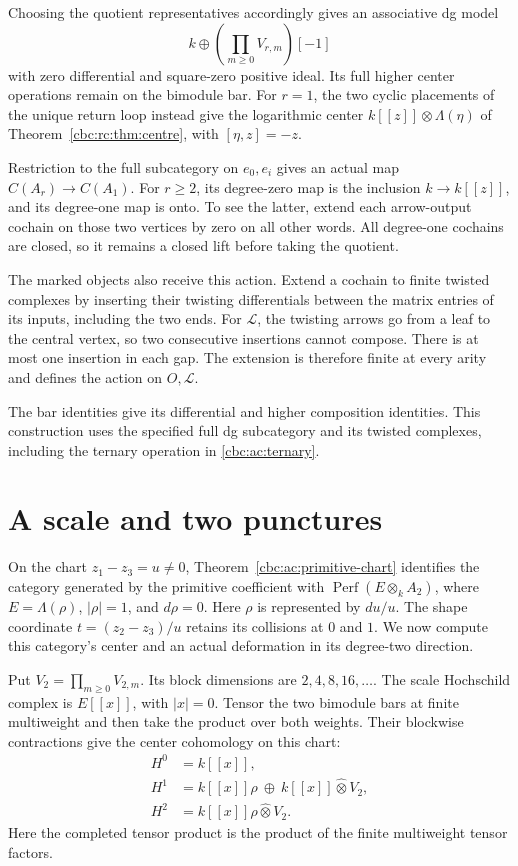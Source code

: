 Choosing the quotient representatives accordingly
gives an associative dg model
\[
 k\oplus\left(\prod_{m\geq0}V_{r,m}\right)[-1]
\]
with zero differential and square-zero positive ideal.  Its full
higher center operations remain on the bimodule bar.  For \(r=1\),
the two cyclic placements of the unique return loop instead give
the logarithmic center \(k[[z]]\otimes\Lambda(\eta)\) of
Theorem~\ref{cbc:rc:thm:centre}, with \([\eta,z]=-z\).

Restriction to the full subcategory on \(e_0,e_i\) gives an actual
map \(C(A_r)\to C(A_1)\).  For \(r\geq2\), its degree-zero map
is the inclusion \(k\to k[[z]]\), and its degree-one map is onto.
To see the latter, extend each arrow-output cochain on those two
vertices by zero on all other words.  All degree-one cochains are closed,
so it remains a closed lift before taking the quotient.

The marked objects also receive this action.  Extend a cochain to
finite twisted complexes by inserting their twisting differentials
between the matrix entries of its inputs, including the two ends.
For \(\mathcal L\), the twisting arrows go from a leaf to the central
vertex, so two consecutive insertions cannot compose.  There is
at most one insertion in each gap.  The extension is therefore
finite at every arity and defines the action on \(O,\mathcal L\).

The bar identities give its differential and higher composition
identities.  This construction uses the specified full dg
subcategory and its twisted complexes, including the ternary
operation in \eqref{cbc:ac:ternary}.

\section{A scale and two punctures}
\label{cbc:rc:scale-shape}

On the chart \(z_1-z_3=u\ne0\), Theorem~\ref{cbc:ac:primitive-chart}
identifies the category generated by the primitive coefficient with
\(\operatorname{Perf}(E\otimes_k A_2)\), where
\(E=\Lambda(\rho)\), \(|\rho|=1\), and \(d\rho=0\).
Here \(\rho\) is represented by \(du/u\).
The shape coordinate \(t=(z_2-z_3)/u\) retains its collisions at
\(0\) and \(1\).  We now compute this category's center and an actual
deformation in its degree-two direction.

Put \(V_2=\prod_{m\geq0}V_{2,m}\). Its block dimensions are
\(2,4,8,16,\ldots\).  The scale Hochschild complex is
\(E[[x]]\), with \(|x|=0\).  Tensor the two bimodule bars at finite
multiweight and then take the product over both weights.  Their
blockwise contractions give the center cohomology on this chart:
\begin{equation}\label{cbc:rc:mpc:eq:chart-centre}
\begin{aligned}
 H^0&=k[[x]],\\
 H^1&=k[[x]]\rho\ \oplus\ k[[x]]\widehat\otimes V_2,\\
 H^2&=k[[x]]\rho\widehat\otimes V_2.
\end{aligned}
\end{equation}
Here the completed tensor product is the product of the finite
multiweight tensor factors.

